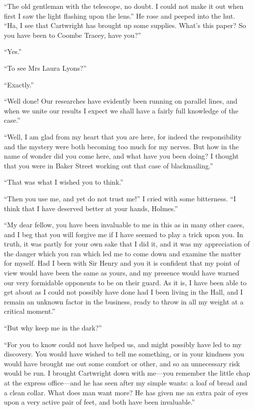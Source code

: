 \documentclass[paper=5.5in:8.5in,BCOR=7mm,twoside,DIV=calc,12pt,usegeometry,openany,chapterprefix,endperiod,headings=big]{scrbook} %
\begin{document}
\enquote{The old gentleman with the telescope, no doubt. I could not make it out when first I saw the light flashing upon the lens.} He rose and peeped into the hut. \enquote{Ha, I see that Cartwright has brought up some supplies. What's this paper? So you have been to Coombe Tracey, have you?}

\enquote{Yes.}

\enquote{To see Mrs Laura Lyons?}

\enquote{Exactly.}

\enquote{Well done! Our researches have evidently been running on parallel lines, and when we unite our results I expect we shall have a fairly full knowledge of the case.}

\enquote{Well, I am glad from my heart that you are here, for indeed the responsibility and the mystery were both becoming too much for my nerves. But how in the name of wonder did you come here, and what have you been doing? I thought that you were in Baker Street working out that case of blackmailing.}

\enquote{That was what I wished you to think.}

\enquote{Then you use me, and yet do not trust me!} I cried with some bitterness. \enquote{I think that I have deserved better at your hands, \newline Holmes.}

\enquote{My dear fellow, you have been invaluable to me in this as in many other cases, and I beg that you will forgive me if I have seemed to play a trick upon you. In truth, it was partly for your own sake that I did it, and it was my appreciation of the danger which you ran which led me to come down and examine the matter for myself. Had I been with Sir Henry and you it is confident that my point of view would have been the same as yours, and my presence would have warned our very formidable opponents to be on their guard. As it is, I have been able to get about as I could not possibly have done had I been living in the Hall, and I remain an unknown factor in the business, ready to throw in all my weight at a critical moment.}

\enquote{But why keep me in the dark?}

\enquote{For you to know could not have helped us, and might possibly have led to my discovery. You would have wished to tell me something, or in your kindness you would have brought me out some comfort or other, and so an unnecessary risk would be run. I brought Cartwright down with me---you remember the little chap at the express office---and he has seen after my simple wants: a loaf of bread and a clean collar. What does man want more? He has given me an extra pair of eyes upon a very active pair of feet, and both have been invaluable.}
\end{document}
